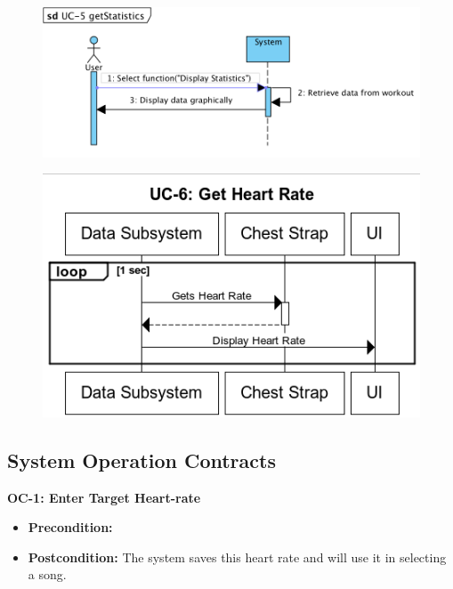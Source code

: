 \documentclass[letterpaper,english, 12pt]{scrreprt}
\begin{document}
\begin{figure}[H]
        \centering
        \includegraphics[width=\textwidth]{img/ssd/ssd_uc5.png}\\
\end{figure}
\begin{figure}[H]
	    \centering
        \includegraphics[width=\textwidth]{img/ssd/ssd_uc6.png}\\
\end{figure}


\subsection{System Operation Contracts}
{\bf OC-1: Enter Target Heart-rate}
\begin{itemize}
	\item {\bf Precondition: } 
	\item {\bf Postcondition: } The system saves this heart rate and will use it in selecting a song.
\end{itemize}
\end{document}
